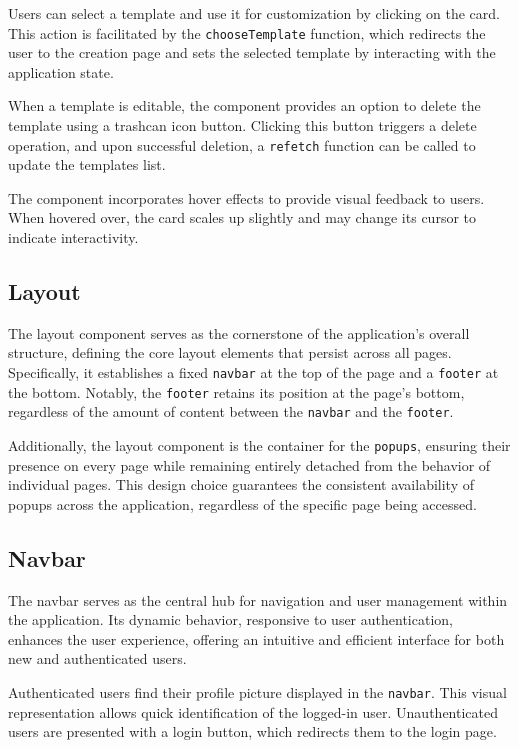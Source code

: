 Users can select a template and use it for customization by clicking on the card. This action is facilitated by the \texttt{chooseTemplate} function, which redirects the user to the creation page and sets the selected template by interacting with the application state.

When a template is editable, the component provides an option to delete the template using a trashcan icon button. Clicking this button triggers a delete operation, and upon successful deletion, a \texttt{refetch} function can be called to update the templates list.

The component incorporates hover effects to provide visual feedback to users. When hovered over, the card scales up slightly and may change its cursor to indicate interactivity.

\subsection{Layout}

The layout component serves as the cornerstone of the application's overall structure, defining the core layout elements that persist across all pages. Specifically, it establishes a fixed \texttt{navbar} at the top of the page and a \texttt{footer} at the bottom. Notably, the \texttt{footer} retains its position at the page's bottom, regardless of the amount of content between the \texttt{navbar} and the \texttt{footer}.

Additionally, the layout component is the container for the \texttt{popups}, ensuring their presence on every page while remaining entirely detached from the behavior of individual pages. This design choice guarantees the consistent availability of popups across the application, regardless of the specific page being accessed.

\subsection{Navbar}

The navbar serves as the central hub for navigation and user management within the application. Its dynamic behavior, responsive to user authentication, enhances the user experience, offering an intuitive and efficient interface for both new and authenticated users.

Authenticated users find their profile picture displayed in the \texttt{navbar}. This visual representation allows quick identification of the logged-in user. Unauthenticated users are presented with a login button, which redirects them to the login page.

